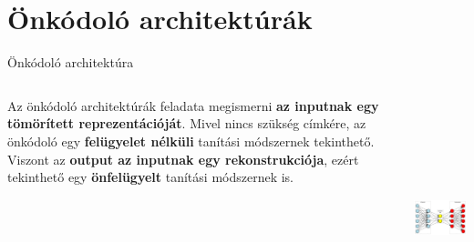 \documentclass[english, aspectratio=169]{beamer}
\makeatletter
\let\origtableofcontents=\tableofcontents
\def\tableofcontents{\@ifnextchar[{\origtableofcontents}{\gobbletableofcontents}}
\def\gobbletableofcontents#1{\origtableofcontents}
\makeatother
\begin{document}
\section{Önkódoló architektúrák}

\begin{frame}
\tableofcontents[currentsection]
\end{frame}

\begin{frame}{Önkódoló architektúra}
\begin{columns}
\begin{column}{.5\textwidth}
Az önkódoló architektúrák feladata megismerni \textbf{az inputnak egy tömörített reprezentációját}. Mivel nincs szükség címkére, az önkódoló egy \textbf{felügyelet nélküli} tanítási módszernek tekinthető. Viszont az \textbf{output az inputnak egy rekonstrukciója}, ezért tekinthető egy \textbf{önfelügyelt} tanítási módszernek is.
\end{column}
\begin{column}{.5\textwidth}
\begin{center}
\includegraphics[height=7cm, width=7cm, keepaspectratio]{graphs/dl_4.png}
\end{center}
\end{column}
\end{columns}
\end{frame}
\end{document}
